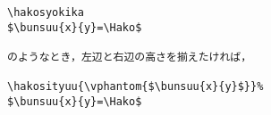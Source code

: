\begin{verbatim}
\hakosyokika
$\bunsuu{x}{y}=\Hako$

のようなとき，左辺と右辺の高さを揃えたければ，

\hakosityuu{\vphantom{$\bunsuu{x}{y}$}}%
$\bunsuu{x}{y}=\Hako$
\end{verbatim}
